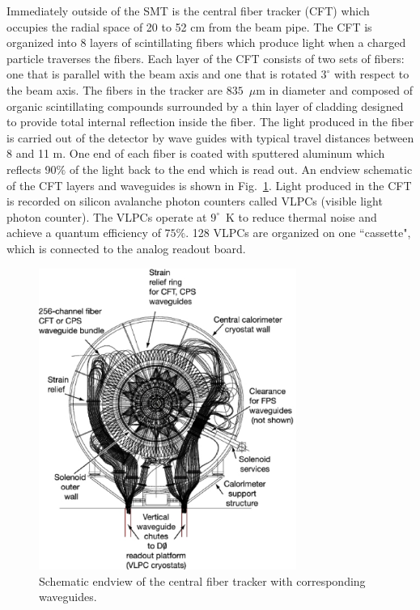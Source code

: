 Immediately outside of the SMT is the central fiber tracker (CFT) which occupies the radial space of 20 to 52 cm from the beam pipe. The CFT is organized into 8 layers of scintillating fibers which produce light when a charged particle traverses the fibers. Each layer of the CFT consists of two sets of fibers: one that is parallel with the beam axis and one that is rotated $3^{\circ}$ with respect to the beam axis. 
The fibers in the tracker are $835$~$\mu$m in diameter and composed of organic scintillating compounds surrounded by a thin layer of cladding designed to provide total internal reflection inside the fiber. The light produced in the fiber is carried out of the detector by wave guides with typical travel distances between 8 and 11 m. One end of each fiber is coated with sputtered aluminum which reflects 90$\%$ of the light back to the end which is read out. An endview schematic of the CFT layers and waveguides is shown in Fig.~\ref{CFT}.  Light produced in the CFT is recorded on silicon avalanche photon counters called VLPCs (visible light photon counter). The VLPCs operate at $9^{\circ}$~K to reduce thermal noise and achieve a quantum efficiency of $75\%$. 128 VLPCs are organized on one ``cassette", which is connected to the analog readout board.

\begin{figure}[!h!tbp]
\begin{center}
\includegraphics[width=0.75\textwidth]{eps/D0/CFT2.eps}
\end{center}
\vspace{-0.1in}
\caption{Schematic endview of the central fiber tracker with corresponding waveguides.}
\label{CFT}
\end{figure}


